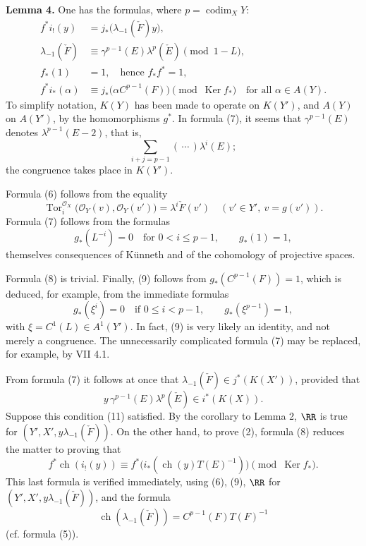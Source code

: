 \documentclass[11pt]{article}
\newcommand{\ch}{\operatorname{ch}}
\newcommand{\Tor}{\operatorname{Tor}}
\providecommand{\codim}{\operatorname{codim}}
\providecommand{\ch}{\operatorname{ch}}
\providecommand{\Tor}{\operatorname{Tor}}
\providecommand{\Ker}{\operatorname{Ker}}
\providecommand{\codim}{\operatorname{codim}}
\begin{document}
\textbf{Lemma 4.} One has the formulas, where \(p=\codim_XY\):
\begin{align}
  f^*i_!(y)&=j_*\bigl(\lambda_{-1}(\check F)y\bigr), \tag{6}\\
  \lambda_{-1}(\check F)&\equiv \gamma^{p-1}(E)\lambda^p(\check E)
    \pmod{1-L}, \tag{7}\\
  f_*(1)&=1,\quad\text{hence }f_*f^*=1, \tag{8}\\
  f^*i_*(\alpha)&\equiv j_*\bigl(\alpha C^{p-1}(F)\bigr)
    \pmod{\Ker f_*}\quad\text{for all }\alpha\in A(Y). \tag{9}
\end{align}
To simplify notation, \(K(Y)\) has been made to operate on \(K(Y')\), and \(A(Y)\) on \(A(Y')\), by the homomorphisms \(g^*\). In formula (7), it seems that \(\gamma^{p-1}(E)\) denotes \(\lambda^{p-1}(E-2)\), that is,
\[
  \sum_{i+j=p-1}(\,\cdots\,)\lambda^i(E);
\]
the congruence takes place in \(K(Y')\).

Formula (6) follows from the equality
\begin{equation}\tag{6 bis}
  \Tor_i^{\mathcal O_X}\bigl(\mathcal O_Y(v),\mathcal O_Y(v')\bigr)
  =
  \lambda^i\check F(v')
  \quad (v'\in Y',\ v=g(v')).
\end{equation}
Formula (7) follows from the formulas
\begin{equation}\tag{10}
  g_*(L^{-i})=0\quad\text{for }0<i\leq p-1,\qquad g_*(1)=1,
\end{equation}
themselves consequences of Künneth and of the cohomology of projective spaces.

Formula (8) is trivial. Finally, (9) follows from \(g_*(C^{p-1}(F))=1\), which is deduced, for example, from the immediate formulas
\begin{equation}\tag{10 bis}
  g_*(\xi^i)=0\quad\text{if }0\leq i<p-1,\qquad
  g_*(\xi^{p-1})=1,
\end{equation}
with \(\xi=C^1(L)\in A^1(Y')\). In fact, (9) is very likely an identity, and not merely a congruence. The unnecessarily complicated formula (7) may be replaced, for example, by VII 4.1.

From formula (7) it follows at once that \(\lambda_{-1}(\check F)\in j^*(K(X'))\), provided that
\begin{equation}\tag{11}
  y\,\gamma^{p-1}(E)\lambda^p(\check E)\in i^*(K(X)).
\end{equation}
Suppose this condition (11) satisfied. By the corollary to Lemma 2, \(\RR\) is true for \((Y',X',y\lambda_{-1}(\check F))\). On the other hand, to prove (2), formula (8) reduces the matter to proving that
\begin{equation}\tag{12}
  f^*\ch(i_!(y))
  \equiv
  f^*\bigl(i_*(\ch(y)T(E)^{-1})\bigr)
  \pmod{\Ker f_*}.
\end{equation}
This last formula is verified immediately, using (6), (9), \(\RR\) for \((Y',X',y\lambda_{-1}(\check F))\), and the formula
\begin{equation}\tag{13}
  \ch(\lambda_{-1}(\check F))=C^{p-1}(F)T(F)^{-1}
\end{equation}
(cf. formula (5)).
\end{document}
